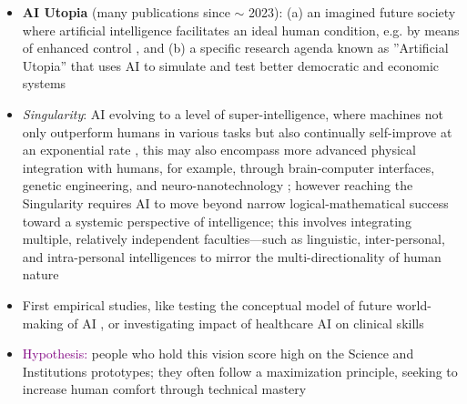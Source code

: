 \documentclass[jou,floatsintext]{apa7}
\begin{document}
\begin{itemize}
\begin{itemize}
\begin{itemize}
        \item \textbf{AI Utopia} (many publications since $\sim$ 2023): (a) an imagined future society where artificial intelligence facilitates an ideal human condition, e.g. by means of enhanced control \parencite{wojewodaARTIFICIALINTELLIGENCESOCIAL2023}, and (b) a specific research agenda known as ''Artificial Utopia'' that uses AI to simulate and test better democratic and economic systems \parencite{gerdesCOMMONSIMSimulatingUtopia2023, oswaldArtificialUtopiaSimulation2025}
        \item[$\rightarrow$] \textit{Singularity}: AI evolving to a level of super-intelligence, where machines not only outperform humans in various tasks but also continually self-improve at an exponential rate \parencite{kurzweilSingularityNearerWhen2024}, this may also encompass more advanced physical integration with humans, for example, through brain-computer interfaces, genetic engineering, and neuro-nanotechnology \parencite{carrollNavigatingUtopiaDystopia2024}; however reaching the Singularity requires AI to move beyond narrow logical-mathematical success toward a systemic perspective of intelligence; this involves integrating multiple, relatively independent faculties---such as linguistic, inter-personal, and intra-personal intelligences to mirror the multi-directionality of human nature \parencite{hoffmannPhilosophicalViewSingularity2023}
        \item[$\rightarrow$] First empirical studies, like testing the conceptual model of future world-making of AI \parencite{pauketatWorldmakingFutureSentient2025}, or investigating impact of healthcare AI on clinical skills \parencite{aquinoUtopiaDystopiaProfessional2023}
        \item \textcolor{purple}{Hypothesis:} people who hold this vision score high on the Science and Institutions prototypes; they often follow a maximization principle, seeking to increase human comfort through technical mastery \parencite[see empirical results in][]{fernandoProfilesIdealSociety2023}
    \end{itemize}
\end{itemize}
    

\end{itemize}
\end{document}
